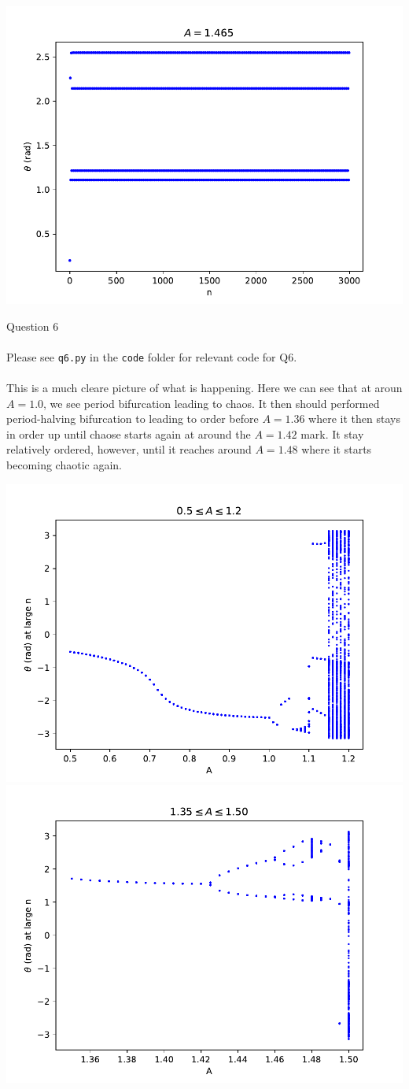 \documentclass[10pt]{article} %
\begin{document}
\begin{center}
\includegraphics[width=.4\textwidth]{../figs/q5_A_1465_Poincare.pdf}
\end{center}
\noindent \Large{Question 6}
\\ \\
\noindent \normalsize{Please see \texttt{q6.py} in the \texttt{code} folder for relevant code for Q6.}
\\ \\
This is a much cleare picture of what is happening. Here we can see that at aroun $A=1.0$, we see period bifurcation leading to chaos. It then should performed period-halving bifurcation to leading to order before $A=1.36$ where it then stays in order up until chaose starts again at around the $A=1.42$ mark. It stay relatively ordered, however, until it reaches around $A=1.48$ where it starts becoming chaotic again.
\begin{center}
\includegraphics[width=.4\textwidth]{../figs/q6_05_12.pdf}
\includegraphics[width=.4\textwidth]{../figs/q6_135_150.pdf}
\end{center}
\end{document}
